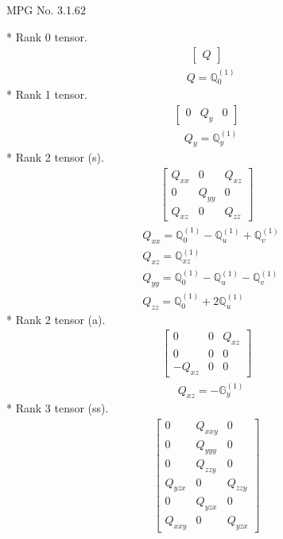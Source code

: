 \documentclass[fleqn,8pt,landscape]{jsarticle}
\begin{document}
\setcounter{MaxMatrixCols}{32}

\renewcommand{\tablename}{Table~}
\renewcommand{\figurename}{Figure~}
\begin{center}
\LARGE
MPG No. 3.1.6\quad$2$
\end{center}
* Rank 0 tensor.
\begin{align*}
\begin{bmatrix} Q \end{bmatrix}
\end{align*}
\begin{align*}
& Q = \mathbb{Q}_{0}^{(1)}
\end{align*}
* Rank 1 tensor.
\begin{align*}
\begin{bmatrix} 0 & Q_{y} & 0 \end{bmatrix}
\end{align*}
\begin{align*}
& Q_{y} = \mathbb{Q}_{y}^{(1)}
\end{align*}
* Rank 2 tensor (s).
\begin{align*}
\begin{bmatrix} Q_{xx} & 0 & Q_{xz} \\ 0 & Q_{yy} & 0 \\ Q_{xz} & 0 & Q_{zz} \end{bmatrix}
\end{align*}
\begin{align*}
& Q_{xx} = \mathbb{Q}_{0}^{(1)} - \mathbb{Q}_{u}^{(1)} + \mathbb{Q}_{v}^{(1)} \\
& Q_{xz} = \mathbb{Q}_{xz}^{(1)} \\
& Q_{yy} = \mathbb{Q}_{0}^{(1)} - \mathbb{Q}_{u}^{(1)} - \mathbb{Q}_{v}^{(1)} \\
& Q_{zz} = \mathbb{Q}_{0}^{(1)} + 2 \mathbb{Q}_{u}^{(1)}
\end{align*}
* Rank 2 tensor (a).
\begin{align*}
\begin{bmatrix} 0 & 0 & Q_{xz} \\ 0 & 0 & 0 \\ - Q_{xz} & 0 & 0 \end{bmatrix}
\end{align*}
\begin{align*}
& Q_{xz} = - \mathbb{G}_{y}^{(1)}
\end{align*}
* Rank 3 tensor (ss).
\begin{align*}
\begin{bmatrix} 0 & Q_{xxy} & 0 \\ 0 & Q_{yyy} & 0 \\ 0 & Q_{zzy} & 0 \\ Q_{yzx} & 0 & Q_{zzy} \\ 0 & Q_{yzx} & 0 \\ Q_{xxy} & 0 & Q_{yzx} \end{bmatrix}
\end{align*}
\end{document}
